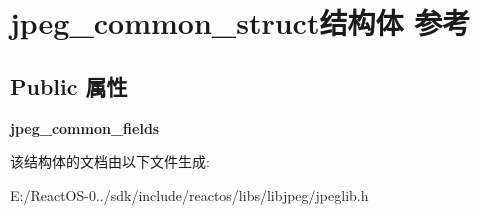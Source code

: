 \hypertarget{structjpeg__common__struct}{}\section{jpeg\+\_\+common\+\_\+struct结构体 参考}
\label{structjpeg__common__struct}
\subsection*{Public 属性}
\begin{DoxyCompactItemize}
\item 
\mbox{\label{structjpeg__common__struct_af0328603f836658f65d39679f6bbfa7a}} 
{\bfseries jpeg\+\_\+common\+\_\+fields}
\end{DoxyCompactItemize}


该结构体的文档由以下文件生成\+:\begin{DoxyCompactItemize}
\item 
E\+:/\+React\+O\+S-\/0../sdk/include/reactos/libs/libjpeg/jpeglib.\+h\end{DoxyCompactItemize}
